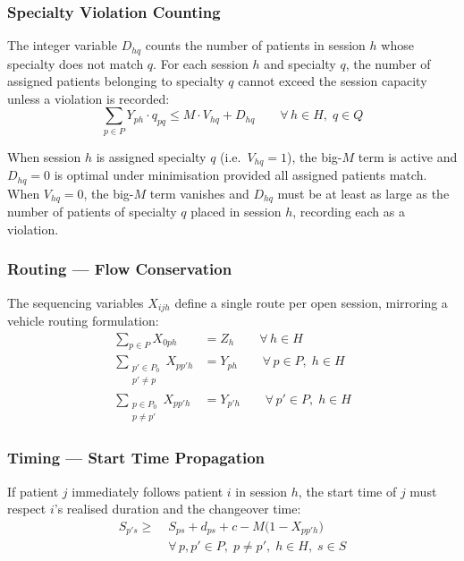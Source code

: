 \subsubsection{Specialty Violation Counting}

The integer variable $D_{hq}$ counts the number of patients in session $h$
whose specialty does not match $q$. For each session $h$ and specialty $q$,
the number of assigned patients belonging to specialty $q$ cannot exceed the
session capacity unless a violation is recorded:
%
\begin{equation}
  \sum_{p \in P} Y_{ph} \cdot q_{pq}
  \leq M \cdot V_{hq} + D_{hq}
  \qquad \forall\, h \in H,\; q \in Q
  \label{eq:viol}
\end{equation}

When session $h$ is assigned specialty $q$ (i.e.\ $V_{hq} = 1$), the big-$M$
term is active and $D_{hq} = 0$ is optimal under minimisation provided all
assigned patients match. When $V_{hq} = 0$, the big-$M$ term vanishes and
$D_{hq}$ must be at least as large as the number of patients of specialty $q$
placed in session $h$, recording each as a violation.

\subsubsection{Routing --- Flow Conservation}

The sequencing variables $X_{ijh}$ define a single route per open session,
mirroring a vehicle routing formulation:
%
\begin{align}
  \sum_{p \in P} X_{0ph} &= Z_h
  \qquad \forall\, h \in H
  \label{eq:depot} \\[2pt]
  \sum_{\substack{p' \in P_0 \\ p' \neq p}} X_{pp'h} &= Y_{ph}
  \qquad \forall\, p \in P,\; h \in H
  \label{eq:flow_out} \\[2pt]
  \sum_{\substack{p \in P_0 \\ p \neq p'}} X_{pp'h} &= Y_{p'h}
  \qquad \forall\, p' \in P,\; h \in H
  \label{eq:flow_in}
\end{align}

\subsubsection{Timing --- Start Time Propagation}

If patient $j$ immediately follows patient $i$ in session $h$, the start time
of $j$ must respect $i$'s realised duration and the changeover time:
%
\begin{align}
  S_{p's} \geq\; & S_{ps} + d_{ps} + c
                   - M\bigl(1 - X_{pp'h}\bigr) \nonumber \\
                 & \forall\, p,p' \in P,\; p \neq p',\; h \in H,\; s \in S
  \label{eq:time_seq}
\end{align}

